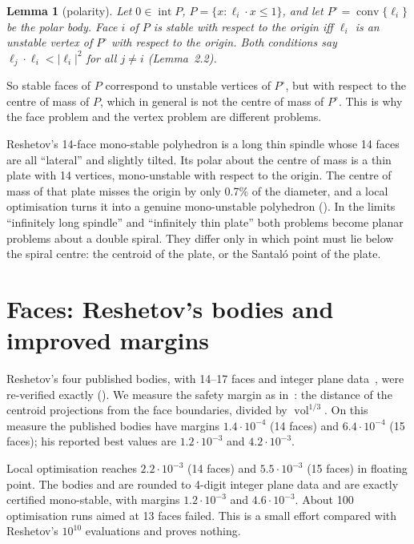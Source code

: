 \documentclass[11pt]{amsart}
\newtheorem*{lemma}{Lemma}
\newcommand{\conv}{\operatorname{conv}}
\newcommand{\vol}{\operatorname{vol}}
\begin{document}
\begin{lemma}[polarity]
Let $0\in\operatorname{int}P$, $P=\{x:\ell_i\cdot x\le1\}$, and let $P^\circ=\conv\{\ell_i\}$ be the polar
body. Face $i$ of $P$ is stable with respect to the origin iff $\ell_i$ is an unstable vertex of $P^\circ$
with respect to the origin. Both conditions say $\ell_j\cdot\ell_i<|\ell_i|^2$ for all $j\ne i$
(Lemma~2.2).
\end{lemma}

So stable faces of $P$ correspond to unstable vertices of $P^\circ$, but with respect to the centre of
mass of $P$, which in general is not the centre of mass of $P^\circ$. This is why the face problem and the
vertex problem are different problems.

Reshetov's 14-face mono-stable polyhedron is a long thin spindle whose 14 faces are all ``lateral'' and
slightly tilted. Its polar about the centre of mass is a thin plate with 14 vertices, mono-unstable with
respect to the origin. The centre of mass of that plate misses the origin by only 0.7\% of the diameter,
and a local optimisation turns it into a genuine mono-unstable polyhedron
(). In the limits ``infinitely long spindle'' and
``infinitely thin plate'' both problems become planar problems about a double spiral. They differ only in
which point must lie below the spiral centre: the centroid of the plate, or the Santal\'o point of the
plate.

\section{Faces: Reshetov's bodies and improved margins}

Reshetov's four published bodies, with 14--17 faces and integer plane data~\cite{Res14}, were re-verified
exactly (). We measure the safety margin as
in~\cite{Res14}: the distance of the centroid projections from the face boundaries, divided by
$\vol^{1/3}$. On this measure the published bodies have margins $1.4\cdot10^{-4}$ (14 faces) and
$6.4\cdot10^{-4}$ (15 faces); his reported best values are $1.2\cdot10^{-3}$ and $4.2\cdot10^{-3}$.

Local optimisation reaches $2.2\cdot10^{-3}$ (14 faces) and $5.5\cdot10^{-3}$ (15 faces) in floating
point. The bodies  and  are rounded to
4-digit integer plane data and are exactly certified mono-stable, with margins $1.2\cdot10^{-3}$ and
$4.6\cdot10^{-3}$. About 100 optimisation runs aimed at 13 faces failed. This is a small effort compared
with Reshetov's $10^{10}$ evaluations and proves nothing.
\end{document}

